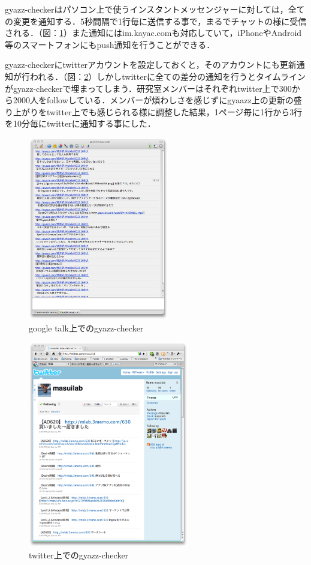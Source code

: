 gyazz-checkerはパソコン上で使うインスタントメッセンジャーに対しては，全ての変更を通知する．5秒間隔で1行毎に送信する事で，まるでチャットの様に受信される．（図：\ref{fig:checker}）また通知にはim.kayac.com\cite{imkayac}も対応していて，iPhoneやAndroid等のスマートフォンにもpush通知を行うことができる．

gyazz-checkerにtwitterアカウントを設定しておくと，そのアカウントにも更新通知が行われる．（図：\ref{fig:twitter}）しかしtwitterに全ての差分の通知を行うとタイムラインがgyazz-checkerで埋まってしまう．研究室メンバーはそれぞれtwitter上で300から2000人をfollowしている．メンバーが煩わしさを感じずにgyaazz上の更新の盛り上がりをtwitter上でも感じられる様に調整した結果，1ページ毎に1行から3行を10分毎にtwitterに通知する事にした．

\begin{figure}
  \begin{center}
    \includegraphics[height=80mm]{img/gyazz-checker.png}
  \end{center}
  \caption{google talk上でのgyazz-checker}
  \label{fig:checker}
\end{figure}

\begin{figure}
  \begin{center}
    \includegraphics[height=90mm]{img/gyazz-twitter.png}
  \end{center}
  \caption{twitter上でのgyazz-checker}
  \label{fig:twitter}
\end{figure}

